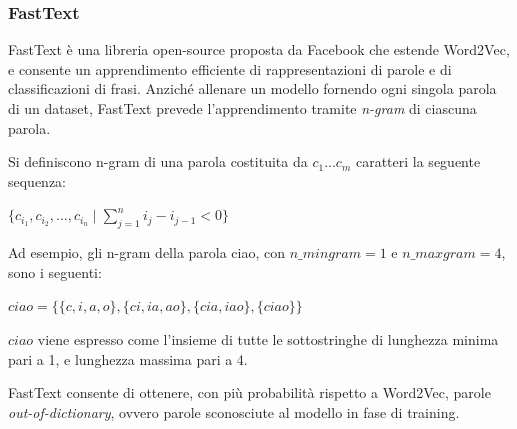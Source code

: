 \subsubsection{FastText}
\label{sec:fasttext}
FastText è una libreria open-source proposta da Facebook che estende Word2Vec, e consente un apprendimento efficiente di rappresentazioni di parole e di classificazioni di frasi.
Anziché allenare un modello fornendo ogni singola parola di un dataset, FastText prevede l'apprendimento tramite \textit{n-gram} di ciascuna parola.

Si definiscono n-gram di una parola costituita da $c_1...c_m$ caratteri la seguente sequenza:
\begin{center}
$\{ c_{i_1}, c_{i_2}, \ldots, c_{i_n} \mid \sum\limits_{j=1}^n i_{j} - i_{j-1} < 0 \}$
\end{center}
Ad esempio, gli n-gram della parola ciao, con $n\_mingram = 1$ e $n\_maxgram = 4$, sono i seguenti:

\begin{center}
    $ciao = \{\{c, i, a, o\},\{ci, ia, ao\}, \{cia, iao\}, \{ciao\}\}$
\end{center}
$ciao$ viene espresso come l'insieme di tutte le sottostringhe di lunghezza minima pari a 1, e lunghezza massima pari a 4.



FastText consente di ottenere, con più probabilità rispetto a Word2Vec, parole \emph{out-of-dictionary}, ovvero parole sconosciute al modello in fase di training.
